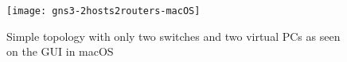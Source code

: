 \begin{figure}
  \centering
  \texttt{[image: gns3-2hosts2routers-macOS]}
  \caption{Simple topology with only two switches and two virtual PCs as seen on the GUI in macOS}
  \label{fig:gns3-2hosts2routers-macOS}
\end{figure}
